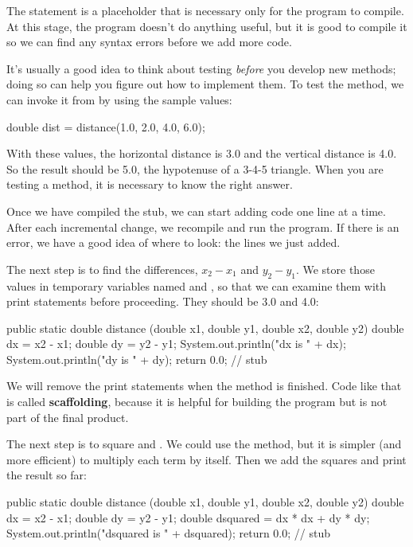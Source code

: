 The  statement is a placeholder that is necessary only for the program to compile.
At this stage, the program doesn't do anything useful, but it is good to compile it so we can find any syntax errors before we add more code.


It's usually a good idea to think about testing {\em before} you develop new methods; doing so can help you figure out how to implement them.
To test the method, we can invoke it from  by using the sample values:

\begin{code}
double dist = distance(1.0, 2.0, 4.0, 6.0);
\end{code}

With these values, the horizontal distance is 3.0 and the vertical distance is 4.0.
So the result should be 5.0, the hypotenuse of a 3-4-5 triangle.
When you are testing a method, it is necessary to know the right answer.

Once we have compiled the stub, we can start adding code one line at a time.
After each incremental change, we recompile and run the program.
If there is an error, we have a good idea of where to look: the lines we just added.

The next step is to find the differences, $x_2 - x_1$ and $y_2 - y_1$.
We store those values in temporary variables named  and , so that we can examine them with print statements before proceeding.
They should be 3.0 and 4.0:

\begin{code}
public static double distance
        (double x1, double y1, double x2, double y2) {
    double dx = x2 - x1;
    double dy = y2 - y1;
    System.out.println("dx is " + dx);
    System.out.println("dy is " + dy);
    return 0.0;  // stub
}
\end{code}


We will remove the print statements when the method is finished.
Code like that is called {\bf scaffolding}, because it is helpful for building the program but is not part of the final product.

The next step is to square  and .
We could use the  method, but it is simpler (and more efficient) to multiply each term by itself.
Then we add the squares and print the result so far:

\begin{code}
public static double distance
        (double x1, double y1, double x2, double y2) {
    double dx = x2 - x1;
    double dy = y2 - y1;
    double dsquared = dx * dx + dy * dy;
    System.out.println("dsquared is " + dsquared);
    return 0.0;  // stub
}
\end{code}

